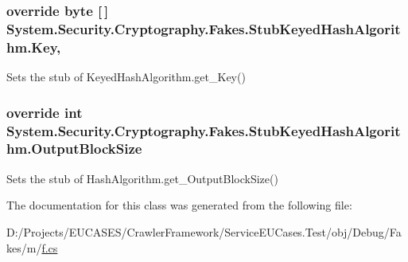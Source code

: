 \hypertarget{class_system_1_1_security_1_1_cryptography_1_1_fakes_1_1_stub_keyed_hash_algorithm_a9ac3758e81e65a76ed9b2d4e66018508}{
\subsubsection[{Key}]{\setlength{\rightskip}{0pt plus 5cm}override byte \mbox{[}$\,$\mbox{]} System.\-Security.\-Cryptography.\-Fakes.\-Stub\-Keyed\-Hash\-Algorithm.\-Key\hspace{0.3cm}{\ttfamily [get]}, {\ttfamily [set]}}}\label{class_system_1_1_security_1_1_cryptography_1_1_fakes_1_1_stub_keyed_hash_algorithm_a9ac3758e81e65a76ed9b2d4e66018508}


Sets the stub of Keyed\-Hash\-Algorithm.\-get\-\_\-\-Key()

\hypertarget{class_system_1_1_security_1_1_cryptography_1_1_fakes_1_1_stub_keyed_hash_algorithm_a4958a34494a542e429ccf8201d2bbc47}{
\subsubsection[{Output\-Block\-Size}]{\setlength{\rightskip}{0pt plus 5cm}override int System.\-Security.\-Cryptography.\-Fakes.\-Stub\-Keyed\-Hash\-Algorithm.\-Output\-Block\-Size\hspace{0.3cm}{\ttfamily [get]}}}\label{class_system_1_1_security_1_1_cryptography_1_1_fakes_1_1_stub_keyed_hash_algorithm_a4958a34494a542e429ccf8201d2bbc47}


Sets the stub of Hash\-Algorithm.\-get\-\_\-\-Output\-Block\-Size()



The documentation for this class was generated from the following file\-:\begin{DoxyCompactItemize}
\item 
D\-:/\-Projects/\-E\-U\-C\-A\-S\-E\-S/\-Crawler\-Framework/\-Service\-E\-U\-Cases.\-Test/obj/\-Debug/\-Fakes/m/\hyperlink{m_2f_8cs}{f.\-cs}\end{DoxyCompactItemize}
